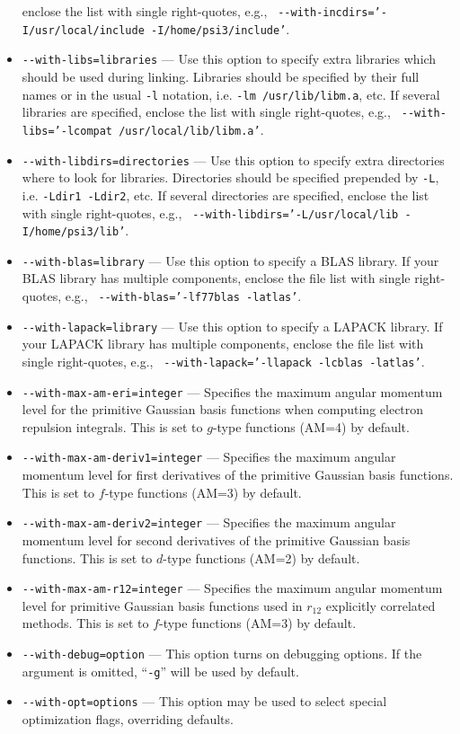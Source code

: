 \documentclass[12pt]{article}
\begin{document}
\begin{itemize}
  enclose the list with single right-quotes, e.g., {\tt
  -}{\tt -with-incdirs='-I/usr/local/include -I/home/psi3/include'}.
\item {\tt -}{\tt -with-libs=libraries} --- Use this option to specify extra
  libraries which should be used during linking. Libraries should be specified by
  their full names or in the usual {\tt -l} notation, i.e. {\tt -lm /usr/lib/libm.a}, etc.
  If several libraries are specified, enclose the list with single right-quotes, e.g., {\tt
  -}{\tt -with-libs='-lcompat /usr/local/lib/libm.a'}.
\item {\tt -}{\tt -with-libdirs=directories} --- Use this option to specify extra
  directories where to look for libraries. Directories should be specified
  prepended by {\tt -L}, i.e. {\tt -Ldir1 -Ldir2}, etc. If several directories are specified,
  enclose the list with single right-quotes, e.g., {\tt
  -}{\tt -with-libdirs='-L/usr/local/lib -I/home/psi3/lib'}.
\item {\tt -}{\tt -with-blas=library} --- Use this option to specify a BLAS
  library.  If your BLAS library has multiple components, enclose the
  file list with single right-quotes, e.g., {\tt
  -}{\tt -with-blas='-lf77blas -latlas'}.
\item {\tt -}{\tt -with-lapack=library} --- Use this option to specify a
  LAPACK library.  If your LAPACK library has multiple components,
  enclose the file list with single right-quotes, e.g., {\tt
  -}{\tt -with-lapack='-llapack -lcblas -latlas'}.
\item {\tt -}{\tt -with-max-am-eri=integer} --- Specifies the maximum
  angular momentum level for the primitive Gaussian basis functions
  when computing electron repulsion integrals.  This is set to
  $g$-type functions (AM=4) by default.
\item {\tt -}{\tt -with-max-am-deriv1=integer} --- Specifies the maximum
  angular momentum level for first derivatives of the primitive
  Gaussian basis functions.  This is set to $f$-type functions (AM=3)
  by default.
\item {\tt -}{\tt -with-max-am-deriv2=integer} --- Specifies the maximum
  angular momentum level for second derivatives of the primitive
  Gaussian basis functions.  This is set to $d$-type functions (AM=2)
  by default.
\item {\tt -}{\tt -with-max-am-r12=integer} --- Specifies the maximum
  angular momentum level for primitive Gaussian basis functions used
  in $r_{12}$ explicitly correlated methods.  This is set to $f$-type
  functions (AM=3) by default.
\item {\tt -}{\tt -with-debug=option} --- This option turns on debugging
  options.  If the argument is omitted, ``{\tt -g}'' will be used by default.
\item {\tt -}{\tt -with-opt=options} --- This option may be used to select
  special optimization flags, overriding defaults.
\end{itemize}
\end{document}
